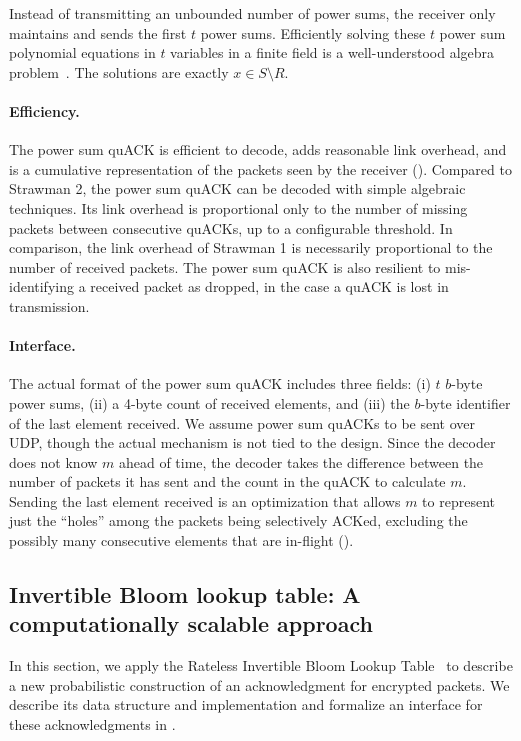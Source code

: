 Instead of transmitting an unbounded number of power sums, the receiver only
maintains and sends the first $t$ power sums. Efficiently solving these $t$
power sum polynomial equations in $t$ variables in a finite field is a
well-understood algebra problem~\cite{eppstein2011straggler}. The solutions are
exactly $x \in S \setminus R$.

\paragraph{Efficiency.}
The power sum quACK is efficient to decode, adds reasonable link overhead,
and is a cumulative representation of the packets seen by the receiver
().
Compared to Strawman 2, the power sum quACK can be decoded with simple
algebraic techniques.
Its link overhead is proportional only to the number of
missing packets between consecutive quACKs, up to a configurable threshold. In
comparison, the link overhead of Strawman 1 is necessarily proportional to the
number of received packets.
The power sum quACK is also resilient to mis-identifying a received packet as
dropped, in the case a quACK is lost in transmission.

\paragraph{Interface.}

The actual format of the power sum quACK includes three fields: (i) $t$ $b$-byte
power sums, (ii) a 4-byte count of received elements, and (iii) the $b$-byte
identifier of the last element received. We assume power sum quACKs to be sent
over UDP, though the actual mechanism is not tied to the design.
Since the decoder
does not know $m$ ahead of time, the decoder takes the difference between the
number of packets it has sent and the count in the quACK to calculate $m$.
Sending the last element received is an optimization that allows $m$ to
represent just the ``holes'' among the packets being selectively ACKed,
excluding the possibly many consecutive elements that are in-flight
().

\subsection{Invertible Bloom lookup table: A computationally scalable approach}
\label{sec:quack:constructions:iblt}


In this section, we apply
the Rateless Invertible Bloom Lookup Table~\cite{yang2024practical}
to describe a new probabilistic construction of an acknowledgment
for encrypted packets. We describe its data structure and implementation
and formalize an interface for these acknowledgments in .

